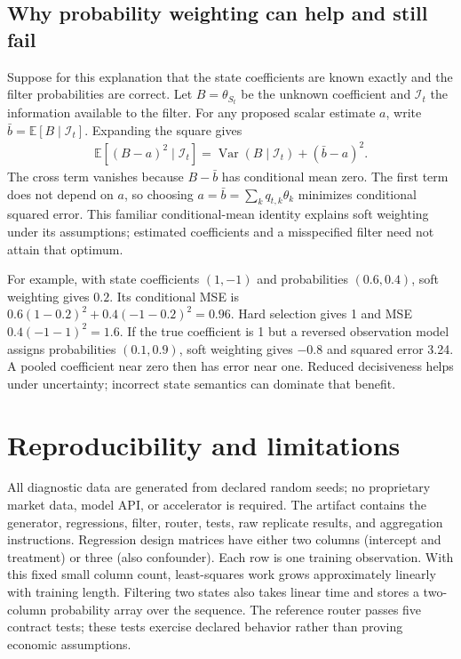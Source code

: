\subsection{Why probability weighting can help and still fail}
Suppose for this explanation that the state coefficients are known exactly and the filter probabilities are correct. Let $B=\theta_{S_t}$ be the unknown coefficient and $\mathcal{I}_t$ the information available to the filter. For any proposed scalar estimate $a$, write $\bar b=\mathbb{E}[B\mid\mathcal{I}_t]$. Expanding the square gives
\begin{align}
 \mathbb{E}[(B-a)^2\mid\mathcal{I}_t]
 =\operatorname{Var}(B\mid\mathcal{I}_t)+(\bar b-a)^2.
\end{align}
The cross term vanishes because $B-\bar b$ has conditional mean zero. The first term does not depend on $a$, so choosing $a=\bar b=\sum_kq_{t,k}\theta_k$ minimizes conditional squared error. This familiar conditional-mean identity explains soft weighting under its assumptions; estimated coefficients and a misspecified filter need not attain that optimum.

For example, with state coefficients $(1,-1)$ and probabilities $(0.6,0.4)$, soft weighting gives $0.2$. Its conditional MSE is $0.6(1-0.2)^2+0.4(-1-0.2)^2=0.96$. Hard selection gives 1 and MSE $0.4(-1-1)^2=1.6$. If the true coefficient is 1 but a reversed observation model assigns probabilities $(0.1,0.9)$, soft weighting gives $-0.8$ and squared error 3.24. A pooled coefficient near zero then has error near one. Reduced decisiveness helps under uncertainty; incorrect state semantics can dominate that benefit.

\section{Reproducibility and limitations}
All diagnostic data are generated from declared random seeds; no proprietary market data, model API, or accelerator is required. The artifact contains the generator, regressions, filter, router, tests, raw replicate results, and aggregation instructions. Regression design matrices have either two columns (intercept and treatment) or three (also confounder). Each row is one training observation. With this fixed small column count, least-squares work grows approximately linearly with training length. Filtering two states also takes linear time and stores a two-column probability array over the sequence. The reference router passes five contract tests; these tests exercise declared behavior rather than proving economic assumptions.

